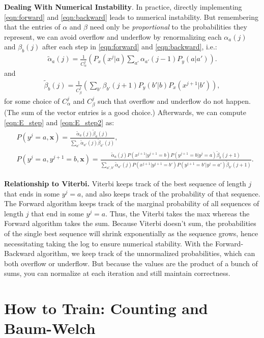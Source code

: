 \documentclass{article}
\newcommand{\alphat}{\tilde{\alpha}}
\newcommand{\betat}{\tilde{\beta}}
\newcommand{\x}{\textbf{x}}
\begin{document}
\textbf{Dealing With Numerical Instability}.  In practice, directly implementing \eqref{eqn:forward} and \eqref{eqn:backward} leads to numerical instability.  But remembering that the entries of $\alpha$ and $\beta$ need only be \emph{proportional} to the probabilities they represent, we can avoid overflow and underflow by renormalizing each $\alpha_a(j)$ and $\beta_b(j)$ after each step in \eqref{eqn:forward} and \eqref{eqn:backward}, i.e.:
\begin{eqnarray}\alphat_a(j) = \frac{1}{C^j_\alpha}\left( P_x(x^j|a)\sum_{a'} \alpha_{a'}(j - 1)P_y(a|a')\right).\label{eqn:forward3}\end{eqnarray}
and
\begin{eqnarray}\betat_b(j) = \frac{1}{C^j_\beta}\left(\sum_{b'} \beta_{b'}(j + 1)P_y(b'|b)P_x(x^{j+1}|b')\right),\label{eqn:backward3}\end{eqnarray}
for some choice of $C^j_\alpha$ and $C^j_\beta$ such that overflow and underflow do not happen.  (The sum of the vector entries is a good choice.)  Afterwards, we can compute \eqref{eqn:E_step} and \eqref{eqn:E_step2} as:
\begin{eqnarray}
&P(y^j=a,\x) = \frac{\alphat_a(j)\betat_a(j)}{\sum_{a'} \alphat_{a'}(j)\betat_{a'}(j)},\\
&P(y^j=a,y^{j+1}=b,\x) = \frac{\alphat_a(j)P(x^{j+1}|y^{j+1}=b)P(y^{j+1}=b|y^j=a)\betat_b(j + 1)}{\sum_{a',b'}\alphat_{a'}(j)P(x^{j+1}|y^{j+1}=b')P(y^{j+1}=b'|y^j=a')\betat_{b'}(j + 1)}.
\end{eqnarray}


\textbf{Relationship to Viterbi.}    Viterbi keeps track of the best sequence of length $j$ that ends in some $y^j=a$, and also keeps track of the probability of that sequence.  The Forward algorithm keeps track of the marginal probability of all sequences of length $j$ that end in some $y^j=a$.  Thus, the Viterbi takes the max whereas the Forward algorithm takes the sum.  Because Viterbi doesn't sum, the probabilities of the single best sequence will shrink exponentially as the sequence grows, hence necessitating taking the log to ensure numerical stability. With the Forward-Backward algorithm, we keep track of the unnormalized probabilities, which can both overflow or underflow.  But because the values are the product of a bunch of sums, you can normalize at each iteration and still maintain correctness.

\section{How to Train: Counting and Baum-Welch}
\end{document}
